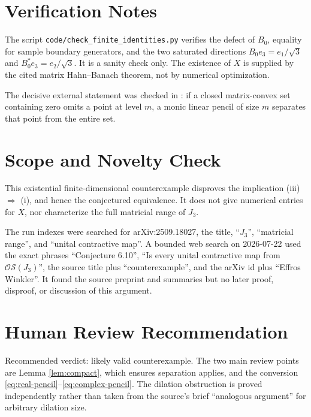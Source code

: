 \documentclass[11pt]{article}
\newcommand{\OS}{\mathcal{OS}}
\begin{document}
\section*{Verification Notes}

The script \texttt{code/check\_finite\_identities.py} verifies the defect of
\(B_0\), equality for sample boundary generators, and the two saturated
directions \(B_0e_3=e_1/\sqrt3\) and \(B_0^*e_3=e_2/\sqrt3\). It is a
sanity check only. The existence of \(X\) is supplied by the cited matrix
Hahn--Banach theorem, not by numerical optimization.

The decisive external statement was checked in
\cite[Theorem 2.2]{HKM}: if a closed matrix-convex set containing zero omits
a point at level \(m\), a monic linear pencil of size \(m\) separates that
point from the entire set.

\section*{Scope and Novelty Check}

This existential finite-dimensional counterexample disproves the implication
(iii) \(\Rightarrow\) (i), and hence the conjectured equivalence. It does not
give numerical entries for \(X\), nor characterize the full matricial range
of \(J_3\).

The run indexes were searched for arXiv:2509.18027, the title, ``\(J_3\)'',
``matricial range'', and ``unital contractive map''. A bounded web search on
2026-07-22 used the exact phrases ``Conjecture 6.10'', ``Is every unital
contractive map from \(\OS(J_3)\)'', the source title plus ``counterexample'',
and the arXiv id plus ``Effros Winkler''. It found the source preprint and
summaries but no later proof, disproof, or discussion of this argument.

\section*{Human Review Recommendation}

Recommended verdict: likely valid counterexample. The two main review points
are Lemma \ref{lem:compact}, which ensures separation applies, and the
conversion \eqref{eq:real-pencil}--\eqref{eq:complex-pencil}. The dilation
obstruction is proved independently rather than taken from the source's brief
``analogous argument'' for arbitrary dilation size.
\end{document}
